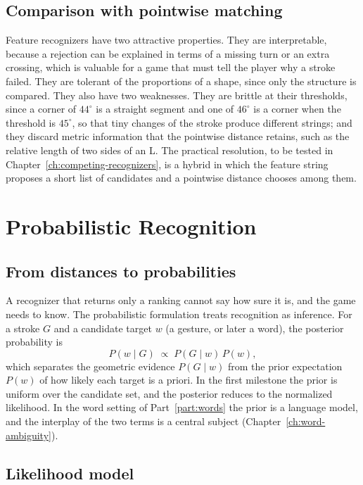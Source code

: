 \section{Comparison with pointwise matching}

Feature recognizers have two attractive properties. They are interpretable, because a rejection can be explained in terms of a missing turn or an extra crossing, which is valuable for a game that must tell the player why a stroke failed. They are tolerant of the proportions of a shape, since only the structure is compared. They also have two weaknesses. They are brittle at their thresholds, since a corner of $44^\circ$ is a straight segment and one of $46^\circ$ is a corner when the threshold is $45^\circ$, so that tiny changes of the stroke produce different strings; and they discard metric information that the pointwise distance retains, such as the relative length of two sides of an L. The practical resolution, to be tested in Chapter~\ref{ch:competing-recognizers}, is a hybrid in which the feature string proposes a short list of candidates and a pointwise distance chooses among them.\evH

\chapter{Probabilistic Recognition}\label{ch:probabilistic}

\section{From distances to probabilities}

A recognizer that returns only a ranking cannot say how sure it is, and the game needs to know. The probabilistic formulation treats recognition as inference. For a stroke $G$ and a candidate target $w$ (a gesture, or later a word), the posterior probability is
\[
P(w\mid G)\;\propto\;P(G\mid w)\,P(w),
\]
which separates the geometric evidence $P(G\mid w)$ from the prior expectation $P(w)$ of how likely each target is a priori. In the first milestone the prior is uniform over the candidate set, and the posterior reduces to the normalized likelihood. In the word setting of Part~\ref{part:words} the prior is a language model, and the interplay of the two terms is a central subject (Chapter~\ref{ch:word-ambiguity}).

\section{Likelihood model}

